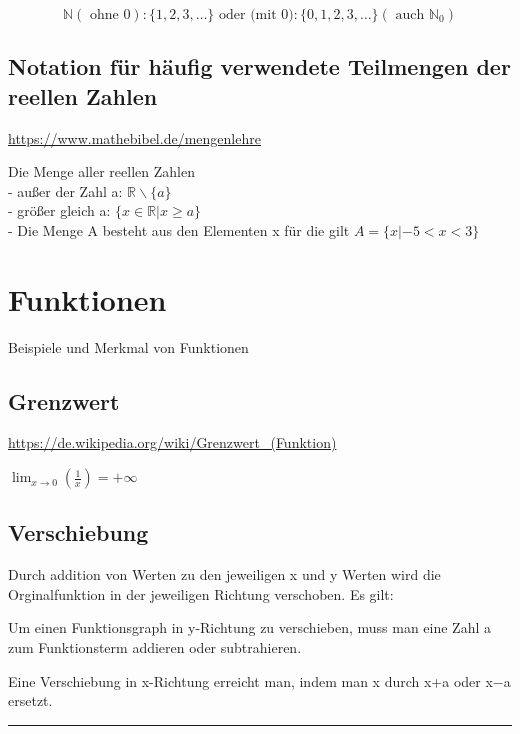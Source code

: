\documentclass[]{book}
\begin{document}
\[\mathbb { N } ( \text { ohne } 0 ) : \{ 1,2,3 , \ldots \} \text { oder (mit } 0 ) : \{ 0,1,2,3 , \ldots \} \left( \text { auch } \mathbb { N } _ { 0 } \right)\]

\section{Notation für häufig verwendete Teilmengen der reellen
Zahlen}\label{notation-fur-haufig-verwendete-teilmengen-der-reellen-zahlen}

\url{https://www.mathebibel.de/mengenlehre}

Die Menge aller reellen Zahlen\\
- außer der Zahl a: \textbf{\(\mathbb { R } \backslash \{ a \}\)}\\
- größer gleich a: \(\{ x \in \mathbb { R } | x \geq a \}\)\\
- Die Menge A besteht aus den Elementen x für die gilt
\(A = \{ x | - 5 < x < 3 \}\)

\chapter{Funktionen}\label{funktionen}

Beispiele und Merkmal von Funktionen

\section{Grenzwert}\label{grenzwert}

\url{https://de.wikipedia.org/wiki/Grenzwert_(Funktion)}

\(\lim _ { x \rightarrow 0 } \left( \frac { 1 } { x } \right) = + \infty\)

\section{Verschiebung}\label{verschiebung}

Durch addition von Werten zu den jeweiligen x und y Werten wird die
Orginalfunktion in der jeweiligen Richtung verschoben. Es gilt:

Um einen Funktionsgraph in y-Richtung zu verschieben, muss man eine Zahl
a zum Funktionsterm addieren oder subtrahieren.

Eine Verschiebung in x-Richtung erreicht man, indem man x durch x+a oder
x−a ersetzt.

\begin{center}\rule{0.5\linewidth}{\linethickness}\end{center}
\end{document}
